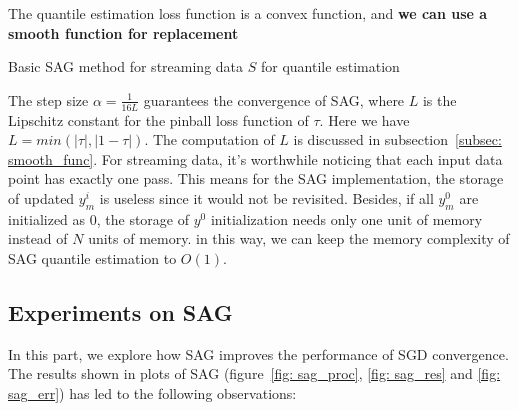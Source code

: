 The quantile estimation loss function is a convex function, and \textbf{we can use a smooth function for replacement}
\begin{algorithm}
    \caption{Basic SAG method for streaming data $S$ for quantile estimation}\label{alg:SAG}
        \begin{algorithmic}[1]
                       
                 
            \EndFor
        \end{algorithmic}
\end{algorithm}
The step size $\alpha = \frac{1}{16L}$ guarantees the convergence of SAG, where $L$ is the Lipschitz constant for the pinball loss function of $\tau$. Here we have $L = min(|\tau|, |1-\tau|)$. The computation of $L$ is discussed in subsection~\ref{subsec: smooth_func}.  For streaming data, it's worthwhile noticing that each input data point has exactly one pass. This means for the SAG implementation, the storage of updated $y_m^i$ is useless since it would not be revisited. Besides, if all $y_m^0$ are initialized as $0$, the storage of $y^0$ initialization needs only one unit of memory instead of $N$ units of memory. in this way, we can keep the memory complexity of SAG quantile estimation to $O(1)$.



\subsection{Experiments on SAG}

In this part, we explore how SAG improves the performance of SGD convergence. The results shown in plots of SAG (figure~\ref{fig: sag_proc}, \ref{fig: sag_res} and \ref{fig: sag_err}) has led to the following observations:

